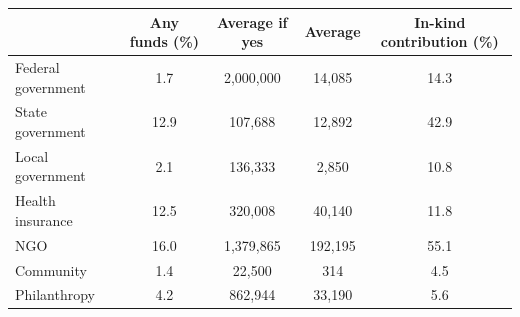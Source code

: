 {
\def\sym#1{\ifmmode^{#1}\else\(^{#1}\)\fi}
\begin{tabular}{l*{1}{cccc}}
\toprule
                    &Any funds (\%)&Average if yes&     Average&In-kind contribution (\%)\\
\midrule
Federal government  &         1.7&   2,000,000&      14,085&        14.3\\
State government    &        12.9&     107,688&      12,892&        42.9\\
Local government    &         2.1&     136,333&       2,850&        10.8\\
Health insurance    &        12.5&     320,008&      40,140&        11.8\\
NGO                 &        16.0&   1,379,865&     192,195&        55.1\\
Community           &         1.4&      22,500&         314&         4.5\\
Philanthropy        &         4.2&     862,944&      33,190&         5.6\\
\bottomrule
\end{tabular}
}
